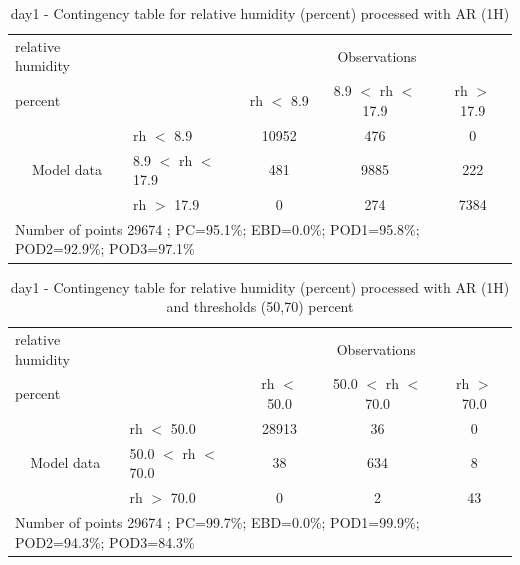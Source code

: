 \begin{table}[p!]
\begin{center}
\begin{tabular}{llccc}
\hline
{relative humidity}                                       &                                                    & \multicolumn{3}{c}{Observations}                 \\
{percent}                                       &                             & rh $<$ 8.9   & 8.9 $<$ rh $<$ 17.9 & rh $>$ 17.9 \\
\hline
\multicolumn{1}{c}{\multirow{3}{*}{Model data}}  & rh $<$ 8.9             & 10952                & 476                       & 0              \\
                                                 & 8.9  $<$ rh $<$ 17.9 & 481                & 9885                       & 222              \\
                                                 & rh $>$ 17.9             & 0                & 274                       & 7384              \\
\hline
\multicolumn{5}{l}{ Number of points        29674 ; PC=95.1\%; EBD=0.0\%; POD1=95.8\%; POD2=92.9\%; POD3=97.1\%}
\end{tabular}
\end{center}
\caption{day1 - Contingency table for  relative humidity (percent) processed with AR (1H)}
\label{tab:contingencyrhAFT:day1}
\end{table}
\begin{table}[p!]
\begin{center}
\begin{tabular}{llccc}
\hline
{relative humidity}                                       &                                                    & \multicolumn{3}{c}{Observations}                 \\
{percent}                                       &                             & rh $<$ 50.0   & 50.0 $<$ rh $<$ 70.0 & rh $>$ 70.0 \\
\hline
\multicolumn{1}{c}{\multirow{3}{*}{Model data}}  & rh $<$ 50.0             & 28913                & 36                       & 0              \\
                                                 & 50.0  $<$ rh $<$ 70.0 & 38                & 634                       & 8              \\
                                                 & rh $>$ 70.0             & 0                & 2                       & 43              \\
\hline
\multicolumn{5}{l}{ Number of points        29674 ; PC=99.7\%; EBD=0.0\%; POD1=99.9\%; POD2=94.3\%; POD3=84.3\%}
\end{tabular}
\end{center}
\caption{day1 - Contingency table for  relative humidity (percent) processed with AR (1H) and thresholds (50,70) percent}
\label{tab:contingencyrhAFT:day1}
\end{table}
